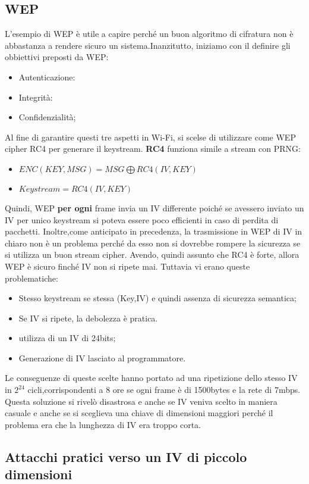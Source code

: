 \documentclass{article}
\theoremstyle{remark}
\begin{document}
\subsection{WEP}
L'esempio di WEP è utile a capire perché un buon algoritmo di cifratura non è abbastanza a rendere sicuro un sistema.Inanzitutto, iniziamo con il definire gli obbiettivi preposti da WEP:
\begin{itemize}
    \item Autenticazione:
    \item Integrità:
    \item Confidenzialità;
\end{itemize}
Al fine di garantire questi tre aspetti in Wi-Fi, si scelse di utilizzare come WEP cipher RC4 per generare il keystream.
\textbf{RC4} funziona simile a stream con PRNG:
\begin{itemize}
    \item $ENC(KEY,MSG)= MSG \bigoplus RC4(IV,KEY)$
    \item $Keystream = RC4(IV,KEY)$
\end{itemize}
Quindi, WEP \textbf{per ogni} frame invia un IV differente poiché se avessero inviato un IV per unico keystream si poteva essere poco efficienti in caso di perdita di pacchetti. Inoltre,come  anticipato in precedenza, la trasmissione in WEP di IV in chiaro non è un problema perché da esso non si dovrebbe rompere la sicurezza se si utilizza un buon stream cipher.
Avendo, quindi assunto che RC4 è forte, allora WEP è sicuro finché IV non si ripete mai. Tuttavia vi erano queste problematiche:
\begin{itemize}
    \item Stesso keystream se stessa (Key,IV) e quindi assenza di sicurezza semantica;
    \item Se IV si ripete, la debolezza è pratica.
    \item utilizza di un IV di 24bits;
    \item Generazione di IV lasciato al programmatore.
\end{itemize}
Le conseguenze di queste scelte hanno portato ad una ripetizione dello stesso IV in $2^{24}$ cicli,corrispondenti a 8 ore se ogni frame è di 1500bytes e la rete di 7mbps.
Questa soluzione si rivelò disastrosa e anche se IV veniva scelto in maniera casuale e anche se si sceglieva una chiave di dimensioni maggiori perché il problema era che la lunghezza di IV era troppo corta.
\subsection{Attacchi pratici verso un IV di piccolo dimensioni}
\end{document}
